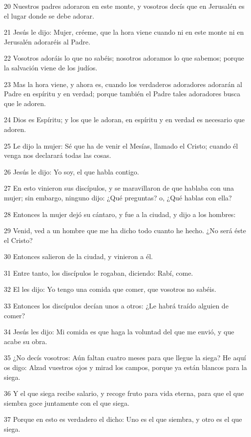 \par 20 Nuestros padres adoraron en este monte, y vosotros decís que en Jerusalén es el lugar donde se debe adorar.
\par 21 Jesús le dijo: Mujer, créeme, que la hora viene cuando ni en este monte ni en Jerusalén adoraréis al Padre.
\par 22 Vosotros adoráis lo que no sabéis; nosotros adoramos lo que sabemos; porque la salvación viene de los judíos.
\par 23 Mas la hora viene, y ahora es, cuando los verdaderos adoradores adorarán al Padre en espíritu y en verdad; porque también el Padre tales adoradores busca que le adoren.
\par 24 Dios es Espíritu; y los que le adoran, en espíritu y en verdad es necesario que adoren.
\par 25 Le dijo la mujer: Sé que ha de venir el Mesías, llamado el Cristo; cuando él venga nos declarará todas las cosas.
\par 26 Jesús le dijo: Yo soy, el que habla contigo.
\par 27 En esto vinieron sus discípulos, y se maravillaron de que hablaba con una mujer; sin embargo, ninguno dijo: ¿Qué preguntas? o, ¿Qué hablas con ella?
\par 28 Entonces la mujer dejó su cántaro, y fue a la ciudad, y dijo a los hombres:
\par 29 Venid, ved a un hombre que me ha dicho todo cuanto he hecho. ¿No será éste el Cristo?
\par 30 Entonces salieron de la ciudad, y vinieron a él.
\par 31 Entre tanto, los discípulos le rogaban, diciendo: Rabí, come.
\par 32 El les dijo: Yo tengo una comida que comer, que vosotros no sabéis.
\par 33 Entonces los discípulos decían unos a otros: ¿Le habrá traído alguien de comer?
\par 34 Jesús les dijo: Mi comida es que haga la voluntad del que me envió, y que acabe su obra.
\par 35 ¿No decís vosotros: Aún faltan cuatro meses para que llegue la siega? He aquí os digo: Alzad vuestros ojos y mirad los campos, porque ya están blancos para la siega.
\par 36 Y el que siega recibe salario, y recoge fruto para vida eterna, para que el que siembra goce juntamente con el que siega.
\par 37 Porque en esto es verdadero el dicho: Uno es el que siembra, y otro es el que siega.
